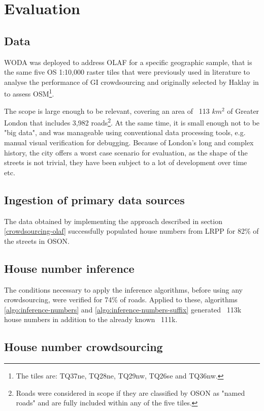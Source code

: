 \section{Evaluation}

\subsection{Data}

WODA was deployed to address OLAF for a specific geographic sample, that is the same five OS 1:10,000 raster tiles that were previously used in literature to analyse the performance of GI crowdsourcing and originally selected by Haklay in \cite{Haklay:2010vs} to assess OSM\footnote{The tiles are: TQ37ne, TQ28ne, TQ29nw, TQ26se and TQ36nw.}.

The scope is large enough to be relevant, covering an area of ~113 $ km^2 $ of Greater London that includes 3,982 roads\footnote{Roads were considered in scope if they are classified by OSON as "named roads" and are fully included within any of the five tiles.}. At the same time, it is small enough not to be "big data", and was manageable using conventional data processing tools, e.g. manual visual verification for debugging. Because of London's long and complex history, the city offers a worst case scenario for evaluation, as the shape of the streets is not trivial, they have been subject to a lot of development over time etc. 

\subsection{Ingestion of primary data sources}

The data obtained by implementing the approach described in section \ref{crowdsourcing-olaf} successfully populated house numbers from LRPP for 82\% of the streets in OSON.

\subsection{House number inference}

The conditions necessary to apply the inference algorithms, before using any crowdsourcing, were verified for 74\% of roads. Applied to these, algorithms \ref{algo:inference-numbers} and \ref{algo:inference-numbers-suffix} generated ~113k house numbers in addition to the already known ~111k. 

\subsection{House number crowdsourcing}

